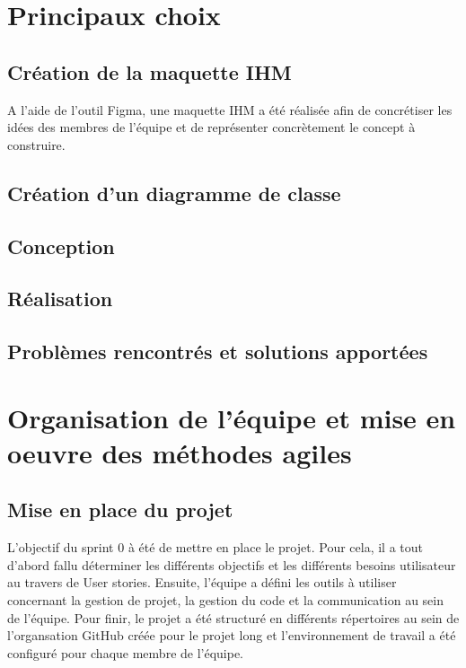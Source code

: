 \documentclass[11pt]{report}
\begin{document}
\chapter{Principaux choix}

\section{Création de la maquette IHM}
A l'aide de l'outil Figma, une maquette IHM a été réalisée afin de concrétiser les idées des membres de l'équipe
et de représenter concrètement le concept à construire.

\section{Création d'un diagramme de classe}

\section{Conception}

\section{Réalisation}

\section{Problèmes rencontrés et solutions apportées}

\chapter{Organisation de l'équipe et mise en oeuvre des méthodes agiles}

\section{Mise en place du projet}
L'objectif du sprint 0 à été de mettre en place le projet. Pour cela, il a tout d'abord fallu
déterminer les différents objectifs et les différents besoins utilisateur au travers de User stories. Ensuite, l'équipe a défini
les outils à utiliser concernant la gestion de projet, la gestion du code et la communication au sein de l'équipe.
Pour finir, le projet a été structuré en différents répertoires au sein de l'organsation GitHub créée pour le projet long
et l'environnement de travail a été configuré pour chaque membre de l'équipe.\newline
\end{document}
